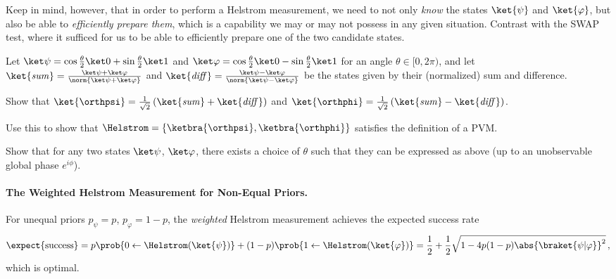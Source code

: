         Keep in mind, however, that in order to perform a Helstrom measurement, we need to
          not only \emph{know} the states $\ket{\psi}$ and $\ket{\varphi}$, but
          also be able to \emph{efficiently prepare them}, which is a capability we
          may or may not possess in any given situation. Contrast with the SWAP
          test, where it sufficed for us to
          be able to efficiently prepare one of the two candidate states.

        \begin{exercise}
          Let $\ket\psi = \cos \frac{\theta}{2} \ket 0 + \sin \frac{\theta}{2} \ket 1$
          and $\ket\varphi = \cos \frac{\theta}{2} \ket 0 - \sin \frac{\theta}{2}
          \ket 1$ for an angle $\theta \in [0,2\pi)$, and let 
          $\ket{\mathit{sum}} = \frac{\ket\psi + \ket\varphi}{\norm{\ket\psi + \ket\varphi}}$ 
          and
          $\ket{\mathit{diff}} = \frac{\ket\psi - \ket\varphi}{\norm{\ket\psi - \ket\varphi}}$
          be the states given by their (normalized) sum and difference.
          \begin{subex}
            \item Show that 
              $\ket{\orthpsi} = 
              \frac{1}{\sqrt 2} \left(
                \ket{\mathit{sum}} + \ket{\mathit{diff}}
              \right)$ and 
              $\ket{\orthphi} = 
              \frac{1}{\sqrt 2} \left(
                \ket{\mathit{sum}} - \ket{\mathit{diff}}
              \right)$.
            \item Use this to show that $\Helstrom = \{ \ketbra{\orthpsi}, \ketbra{\orthphi}
              \}$ satisfies the definition of a PVM.
            \item Show that for any two states $\ket\psi$, $\ket\varphi$, there
              exists a choice of $\theta$ such that they can be expressed as
              above (up to an unobservable global phase $e^{i\phi}$).
          \end{subex}
        \end{exercise}

        \iffalse
          \paragraph{The Weighted Helstrom Measurement for Non-Equal Priors.}
            \begin{theorem}\label{thm:unequal-helstrom}
              For unequal priors $p_\psi = p$, $p_\varphi = 1 - p$, the 
              \emph{weighted} Helstrom measurement achieves the expected success rate 
              \begin{multline*}
                \expect{\text{success}} = p \prob{0 \gets \Helstrom(\ket{\psi})} 
                + (1-p) \prob{1 \gets \Helstrom(\ket{\varphi})}
                = \frac{1}{2} + \frac{1}{2} \sqrt{1 - 4 p (1-p) \abs{\braket{\psi|\varphi}}^2}\, ,
              \end{multline*}
              which is optimal.
            \end{theorem}

